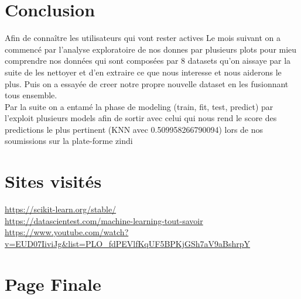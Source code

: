 \documentclass{report}
\makeatletter
\newcommand{\boxspacing}{\kern\kvtcb@left@rule\kern\kvtcb@boxsep}
\newcommand{\prompt}[4]{
        \ttfamily\llap{{\color{#2}[#3]:\hspace{3pt}#4}}\vspace{-\baselineskip}
    }
\makeatother
\begin{document}
    \begin{tcolorbox}[breakable, size=fbox, boxrule=1pt, pad at break*=1mm,colback=cellbackground, colframe=cellborder]
\prompt{In}{incolor}{ }{\boxspacing}
\begin{Verbatim}[commandchars=\\\{\}]

\end{Verbatim}
\end{tcolorbox}

  

 
 \hypertarget{projet_integré_zindi}{ %
\chapter{Conclusion}\label{Conclusion}}
Afin de connaître les utilisateurs qui vont rester actives Le mois suivant on a commencé par l'analyse exploratoire de nos donnes par plusieurs plots pour mieu comprendre nos données qui sont composées par 8 datasets qu'on aissaye par la suite de les nettoyer et d'en extraire ce que nous interesse et nous aiderons le plus. Puis on a essayée de creer notre propre nouvelle dataset en les fusionnant tous ensemble. \\

Par la suite on a entamé la phase de modeling (train, fit, test, predict) par l'exploit plusieurs models afin de sortir avec celui qui nous rend le score des predictions le plus pertinent (KNN avec 0.509958266790094) lors de nos soumissions sur la plate-forme zindi\\


 \hypertarget{projet_integré_zindi}{ %
\chapter{Sites visités}\label{Sites visités}}
\url {https://scikit-learn.org/stable/}\\
\url {https://datascientest.com/machine-learning-tout-savoir}\\
\url{https://www.youtube.com/watch?v=EUD07IiviJg&list=PLO_fdPEVlfKqUF5BPKjGSh7aV9aBshrpY}
 
  \hypertarget{projet_integré_zindi}{ %
\chapter{Page Finale}\label{Page Finale}}


\pagestyle{empty}
\end{document}
